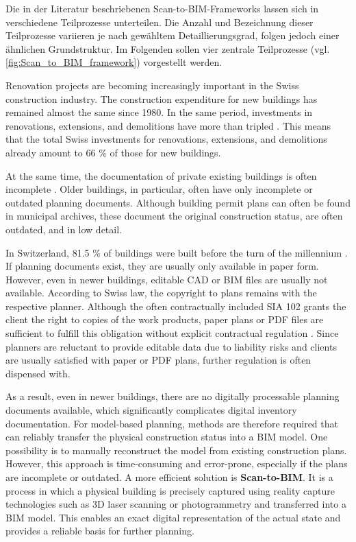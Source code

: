 \begin{German}
    Die in der Literatur beschriebenen Scan-to-BIM-Frameworks lassen sich in verschiedene Teilprozesse unterteilen. Die Anzahl und Bezeichnung dieser Teilprozesse variieren je nach gewähltem Detaillierungsgrad, folgen jedoch einer ähnlichen Grundstruktur. Im Folgenden sollen vier zentrale Teilprozesse (vgl. \ref{fig:Scan_to_BIM_framework}) vorgestellt werden.
\end{German}

\begin{English}
    Renovation projects are becoming increasingly important in the Swiss construction industry. The construction expenditure for new buildings has remained almost the same since 1980. In the same period, investments in renovations, extensions, and demolitions have more than tripled \cite{bundesamtfuerstatstikBauausgabenNachArt}. This means that the total Swiss investments for renovations, extensions, and demolitions already amount to 66 \% of those for new buildings.

    At the same time, the documentation of private existing buildings is often incomplete \cite{dewolfCircularBuiltEnvironmentg, kadenLeitfadenGeodaesieUnd}. Older buildings, in particular, often have only incomplete or outdated planning documents. Although building permit plans can often be found in municipal archives, these document the original construction status, are often outdated, and in low detail.
    
    In Switzerland, 81.5 \% of buildings were built before the turn of the millennium \cite{bundesamtfuerstatstikBauperiode}. If planning documents exist, they are usually only available in paper form. However, even in newer buildings, editable CAD or BIM files are usually not available. According to Swiss law, the copyright to plans remains with the respective planner. Although the often contractually included SIA 102 grants the client the right to copies of the work products, paper plans or PDF files are sufficient to fulfill this obligation without explicit contractual regulation \cite{bundschwBauenRechtenUnd}. Since planners are reluctant to provide editable data due to liability risks and clients are usually satisfied with paper or PDF plans, further regulation is often dispensed with.
    
    As a result, even in newer buildings, there are no digitally processable planning documents available, which significantly complicates digital inventory documentation. For model-based planning, methods are therefore required that can reliably transfer the physical construction status into a BIM model. One possibility is to manually reconstruct the model from existing construction plans. However, this approach is time-consuming and error-prone, especially if the plans are incomplete or outdated. A more efficient solution is \textbf{Scan-to-BIM}. It is a process in which a physical building is precisely captured using reality capture technologies such as 3D laser scanning or photogrammetry and transferred into a BIM model. This enables an exact digital representation of the actual state and provides a reliable basis for further planning.
    

\end{English}
